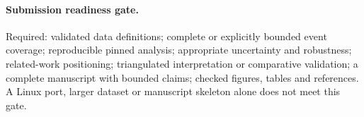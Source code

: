 \documentclass[11pt]{article}
\begin{document}
\paragraph{Submission readiness gate.} Required: validated data definitions;
complete or explicitly bounded event coverage; reproducible pinned analysis;
appropriate uncertainty and robustness; related-work positioning; triangulated
interpretation or comparative validation; a complete manuscript with bounded
claims; checked figures, tables and references. A Linux port, larger dataset or
manuscript skeleton alone does not meet this gate.
\end{document}
